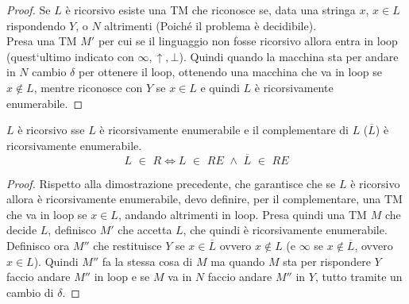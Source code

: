 \begin{proof}
    Se $L$ è ricorsivo esiste una TM che riconosce se, data una stringa $x$,
    $x\in L$ rispondendo $Y$, o $N$ altrimenti (Poiché il problema è decidibile).\\
    Presa una TM $M'$ per cui se il linguaggio non fosse ricorsivo allora entra
    in loop (quest`ultimo indicato con $\infty,\uparrow,\bot$). Quindi quando la macchina sta
    per andare in $N$ cambio $\delta$ per ottenere il loop, ottenendo una
    macchina che va in loop se $x\not\in L$, mentre riconosce con $Y$ se $x\in
    L$ e quindi $L$ è ricorsivamente enumerabile. 
  \end{proof}
\begin{definizione}
  $L$ è ricorsivo sse $L$ è ricorsivamente enumerabile e il complementare di
  $L$ ($\overline{L}$) è ricorsivamente enumerabile.
  \[L\,\,\in\,\,R \iff L\,\,\in\,\,RE\,\,\land\,\,\overline{L}\,\,\in\,\,RE\]
\end{definizione}
\begin{proof}
  Rispetto alla dimostrazione precedente, che garantisce che se $L$ è ricorsivo
  allora è ricorsivamente enumerabile, devo definire, per il complementare, una
  TM che va in loop se $x\in L$, andando altrimenti in loop. Presa quindi una TM
  $M$ che decide $L$, definisco $M'$ che accetta $L$, che quindi è
  ricorsivamente enumerabile. Definisco ora $M''$ che restituisce $Y$ se $x\in
  \overline{L}$ ovvero $x\not\in L$ (e $\infty$ se $x\not\in \overline{L}$,
  ovvero $x\in L$). Quindi $M''$ fa la stessa cosa di $M$ ma quando $M$ sta
  per rispondere $Y$ faccio andare $M''$ in loop e se $M$ va in $N$ faccio
  andare $M''$ in $Y$, tutto tramite un cambio di $\delta$.
\end{proof}


